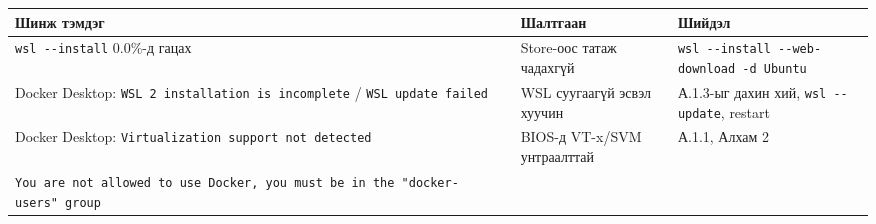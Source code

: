 \begingroup\scriptsize\begin{longtable}[]{@{}lll@{}}
\toprule
\begin{minipage}[b]{0.30\columnwidth}\raggedright
Шинж тэмдэг\strut
\end{minipage} & \begin{minipage}[b]{0.30\columnwidth}\raggedright
Шалтгаан\strut
\end{minipage} & \begin{minipage}[b]{0.30\columnwidth}\raggedright
Шийдэл\strut
\end{minipage}\tabularnewline
\midrule
\endhead
\begin{minipage}[t]{0.30\columnwidth}\raggedright
\texttt{wsl\ -\/-install} 0.0\%-д гацах\strut
\end{minipage} & \begin{minipage}[t]{0.30\columnwidth}\raggedright
Store-оос татаж чадахгүй\strut
\end{minipage} & \begin{minipage}[t]{0.30\columnwidth}\raggedright
\texttt{wsl\ -\/\allowbreak{}-install\ -\/\allowbreak{}-web-download\ -d\ Ubuntu}\strut
\end{minipage}\tabularnewline
\begin{minipage}[t]{0.30\columnwidth}\raggedright
Docker Desktop: \texttt{WSL\ 2\ installation\ is\ incomplete} / \texttt{WSL\ update\ failed}\strut
\end{minipage} & \begin{minipage}[t]{0.30\columnwidth}\raggedright
WSL суугаагүй эсвэл хуучин\strut
\end{minipage} & \begin{minipage}[t]{0.30\columnwidth}\raggedright
А.1.3-ыг дахин хий, \texttt{wsl\ -\/-update}, restart\strut
\end{minipage}\tabularnewline
\begin{minipage}[t]{0.30\columnwidth}\raggedright
Docker Desktop: \texttt{Virtualization\ support\ not\ detected}\strut
\end{minipage} & \begin{minipage}[t]{0.30\columnwidth}\raggedright
BIOS-д VT-x/SVM унтраалттай\strut
\end{minipage} & \begin{minipage}[t]{0.30\columnwidth}\raggedright
А.1.1, Алхам 2\strut
\end{minipage}\tabularnewline
\begin{minipage}[t]{0.30\columnwidth}\raggedright
\texttt{You\ are\ not\ allowed\ to\ use\ Docker,\ you\ must\ be\ in\ the\ "docker-users"\ group}\strut

\end{minipage}
\end{longtable}
